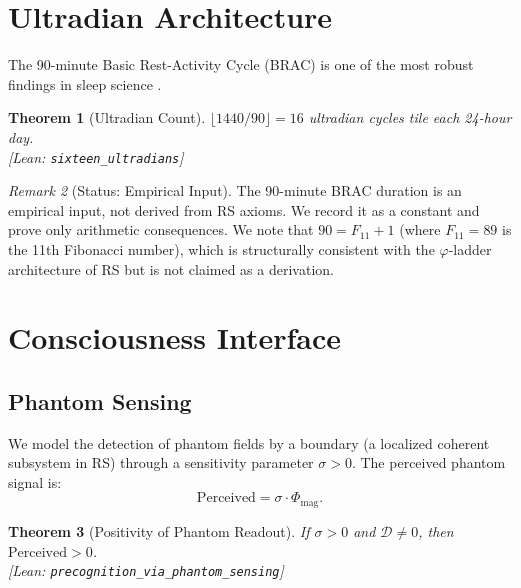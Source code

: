 \documentclass[11pt, a4paper]{article}
\newcommand{\leanref}[1]{\texttt{\small #1}}
\newtheorem{theorem}{Theorem}[section]
\theoremstyle{definition}
\theoremstyle{remark}
\newtheorem{remark}[theorem]{Remark}
\begin{document}
\section{Ultradian Architecture}\label{sec:ultradian}

The 90-minute Basic Rest-Activity Cycle (BRAC) is one of the most
robust findings in sleep science \cite{Kleitman1963,Aserinsky1953}.

\begin{theorem}[Ultradian Count]\label{thm:ultradians}
$\lfloor 1440 / 90 \rfloor = 16$ ultradian cycles tile each
24-hour day.\\
\textup{[Lean: \leanref{sixteen\_ultradians}]}
\end{theorem}

\begin{remark}[Status: Empirical Input]
The 90-minute BRAC duration is an empirical input, not derived from
RS axioms. We record it as a constant and prove only arithmetic
consequences. We note that $90 = F_{11} + 1$ (where $F_{11} = 89$
is the 11th Fibonacci number), which is structurally consistent
with the $\varphi$-ladder architecture of RS but is not claimed as
a derivation.
\end{remark}


\section{Consciousness Interface}\label{sec:consciousness}

\subsection{Phantom Sensing}

We model the detection of phantom fields by a boundary
(a localized coherent subsystem in RS) through a sensitivity
parameter $\sigma > 0$. The perceived phantom signal is:
\[
\mathrm{Perceived} = \sigma \cdot \Phi_{\mathrm{mag}}.
\]

\begin{theorem}[Positivity of Phantom Readout]\label{thm:sensing}
If $\sigma > 0$ and $\mathcal{D} \neq 0$, then
$\mathrm{Perceived} > 0$.\\
\textup{[Lean: \leanref{precognition\_via\_phantom\_sensing}]}
\end{theorem}
\end{document}
